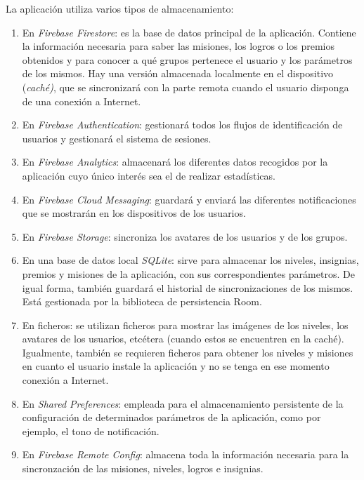\documentclass[twoside]{report}
\begin{document}
La aplicación utiliza varios tipos de almacenamiento:
\begin{enumerate}
\item En \textit{Firebase Firestore}: es la base de datos principal de la aplicación. Contiene la información necesaria para saber las misiones, los logros o los premios obtenidos y para conocer a qué grupos pertenece el usuario y los parámetros de los mismos. Hay una versión almacenada localmente en el dispositivo (\textit{caché)}, que se sincronizará con la parte remota cuando el usuario disponga de una conexión a Internet.

\item En \textit{Firebase Authentication}: gestionará todos los flujos de identificación de usuarios y gestionará el sistema de sesiones.

\item En \textit{Firebase Analytics}: almacenará los diferentes datos recogidos por la aplicación cuyo único interés sea el de realizar estadísticas.

\item En \textit{Firebase Cloud Messaging}: guardará y enviará las diferentes notificaciones que se mostrarán en los dispositivos de los usuarios.

\item En \textit{Firebase Storage}: sincroniza los avatares de los usuarios y de los grupos.

\item En una base de datos local \textit{SQLite}: sirve para almacenar los niveles, insignias, premios y misiones de la aplicación, con sus correspondientes parámetros. De igual forma, también guardará el historial de sincronizaciones de los mismos. Está gestionada por \cite{roompersistence} la biblioteca de persistencia Room.

\item En ficheros: se utilizan ficheros para mostrar las imágenes de los niveles, los avatares de los usuarios, etcétera (cuando estos se encuentren en la caché). Igualmente, también se requieren ficheros para obtener los niveles y misiones en cuanto el usuario instale la aplicación y no se tenga en ese momento conexión a Internet.

\item En \textit{Shared Preferences}: empleada para el almacenamiento persistente de la configuración de determinados parámetros de la aplicación, como por ejemplo, el tono de notificación.

\item En \textit{Firebase Remote Config}: almacena toda la información necesaria para la sincronzación de las misiones, niveles, logros e insignias. 
\end{enumerate}
\end{document}
